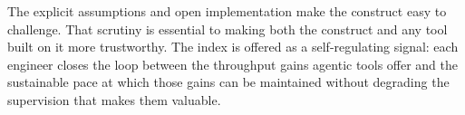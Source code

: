 \documentclass[10pt,twocolumn]{article}
\begin{document}
The explicit assumptions and open implementation make the construct easy to
challenge. That scrutiny is essential to making both the construct and any tool
built on it more trustworthy.
The index is offered as a self-regulating signal: each engineer closes
the loop between the throughput gains agentic tools offer and the sustainable pace
at which those gains can be maintained without degrading the supervision that makes
them valuable.



\end{document}
